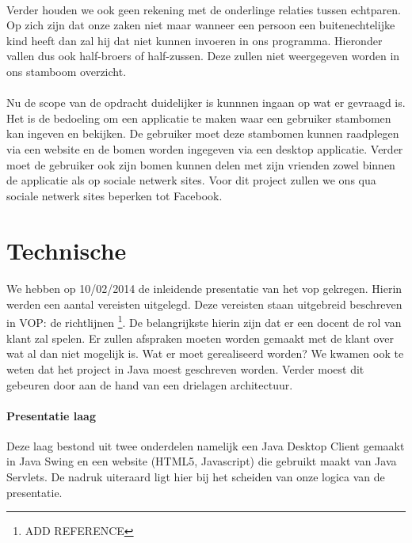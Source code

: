 \documentclass[pdftex,a4paper,12pt,twoside]{report}
\begin{document}
\paragraph{}
Verder houden we ook geen rekening met de onderlinge relaties tussen echtparen. Op zich zijn dat onze zaken niet maar wanneer een persoon een buitenechtelijke kind heeft dan zal hij dat niet kunnen invoeren in ons programma. Hieronder vallen dus ook half-broers of half-zussen. Deze zullen niet weergegeven worden in ons stamboom overzicht.

\paragraph{}
Nu de scope van de opdracht duidelijker is kunnnen ingaan op wat er gevraagd is. Het is de bedoeling om een applicatie te maken waar een gebruiker stambomen kan ingeven en bekijken. De gebruiker moet deze stambomen kunnen raadplegen via een website  en de bomen worden ingegeven via een desktop applicatie. Verder moet de gebruiker ook zijn bomen kunnen delen met zijn vrienden zowel binnen de applicatie als op sociale netwerk sites. Voor dit project zullen we ons qua sociale netwerk sites beperken tot Facebook.

\section{Technische}
\paragraph{}
We hebben op 10/02/2014 de inleidende presentatie van het vop gekregen. Hierin werden een aantal vereisten uitgelegd. Deze vereisten staan uitgebreid beschreven in VOP: de richtlijnen \footnote{ADD REFERENCE}. De belangrijkste hierin zijn dat er een docent de rol van klant zal spelen. Er zullen afspraken moeten worden gemaakt met de klant over wat al dan niet mogelijk is. Wat er moet gerealiseerd worden? We kwamen ook te weten dat het project in Java moest geschreven worden. Verder moest dit gebeuren door aan de hand van een drielagen architectuur. 

\paragraph{Presentatie laag}
Deze laag bestond uit twee onderdelen namelijk een Java Desktop Client gemaakt in Java Swing en een website (HTML5, Javascript) die gebruikt maakt van Java Servlets. De nadruk uiteraard ligt hier bij het scheiden van onze logica van de presentatie.
\end{document}
